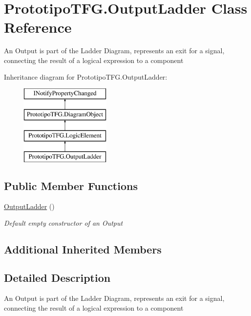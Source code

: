 \hypertarget{class_prototipo_t_f_g_1_1_output_ladder}{}\section{Prototipo\+T\+F\+G.\+Output\+Ladder Class Reference}
\label{class_prototipo_t_f_g_1_1_output_ladder}


An Output is part of the Ladder Diagram, represents an exit for a signal, connecting the result of a logical expression to a component  


Inheritance diagram for Prototipo\+T\+F\+G.\+Output\+Ladder\+:\begin{figure}[H]
\begin{center}
\leavevmode
\includegraphics[height=4.000000cm]{class_prototipo_t_f_g_1_1_output_ladder}
\end{center}
\end{figure}
\subsection*{Public Member Functions}
\begin{DoxyCompactItemize}
\item 
\hyperlink{class_prototipo_t_f_g_1_1_output_ladder_a642c254a525cb6e70ec141aa0fc365d6}{Output\+Ladder} ()
\begin{DoxyCompactList}\small\item\em Default empty constructor of an Output \end{DoxyCompactList}\end{DoxyCompactItemize}
\subsection*{Additional Inherited Members}


\subsection{Detailed Description}
An Output is part of the Ladder Diagram, represents an exit for a signal, connecting the result of a logical expression to a component 



